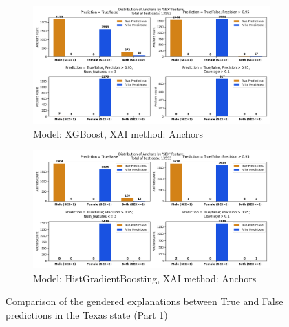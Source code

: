 \begin{figure}[h]
    \centering
    \begin{subfigure}[b]{0.9\textwidth}
        \includegraphics[width=\textwidth]{Images/distribution_folktables/pca_xg_tx_anchors.png}
        \caption{Model: XGBoost, XAI method: Anchors}
        \label{fig:distr_xg_tx_anchors}
    \end{subfigure}
    \hfill
    \begin{subfigure}[b]{0.9\textwidth}
        \includegraphics[width=\textwidth]{Images/distribution_folktables/pca_skrub_tx_anchors.png}
        \caption{Model: HistGradientBoosting, XAI method: Anchors}
        \label{fig:distr_skrub_tx_anchors}
    \end{subfigure}
    \caption{Comparison of the gendered explanations between True and False predictions in the Texas state (Part 1)}
 \end{figure}

